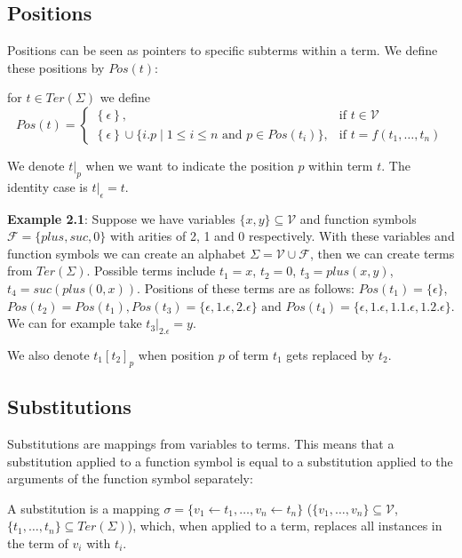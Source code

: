 \subsection{Positions}
Positions can be seen as pointers to specific subterms within a term. We define these positions by $\textit{Pos}\left(t\right)$:
\begin{definition}
for $t \in \textit{Ter}\left(\Sigma\right)$ we define
$$
\textit{Pos}(t) = \left\{\begin{array}{ll}
        \left\{\epsilon\right\}, & \text{if } t \in \mathcal{V}\\
        \left\{\epsilon\right\} \cup \{i.p \mid 1 \leq i \leq n \text{ and } p  \in \textit{Pos}(t_i)\} , & \text{if } t = f(t_1, \dots, t_n)
        \end{array}\right.
$$
\end{definition}
We denote $\left.t\right|_p$ when we want to indicate the position $p$ within term $t$. The identity case is $\left.t\right|_\epsilon = t$.

\textbf{Example 2.1}: Suppose we have variables $\{ x, y \} \subseteq \mathcal{V}$ and function symbols $\mathcal{F} = \{ plus, suc, 0\}$ with arities of 2, 1 and 0 respectively. With these variables and function symbols we can create an alphabet $\Sigma = \mathcal{V} \cup \mathcal{F}$, then we can create terms from $\textit{Ter}(\Sigma)$. Possible terms include $t_1 = x$, $t_2 = 0$, $t_3 = plus(x, y)$, $t_4 = suc(plus(0, x))$. Positions of these terms are as follows: $\textit{Pos}(t_1) = \{ \epsilon \}$, $\textit{Pos}(t_2) = \textit{Pos}(t_1), \textit{Pos}(t_3) = \{ \epsilon, 1.\epsilon, 2.\epsilon \} \text{ and }\textit{Pos}(t_4) = \{ \epsilon, 1.\epsilon, 1.1.\epsilon, 1.2.\epsilon \}$. We can for example take $\left. t_3\right|_{2.\epsilon} = y$.

We also denote $t_1\left[ t_2 \right]_p$ when position $p$ of term $t_1$ gets replaced by $t_2$. 

\subsection{Substitutions}
Substitutions are mappings from variables to terms. This means that a substitution applied to a function symbol is equal to a substitution applied to the arguments of the function symbol separately:
\begin{definition}
A substitution is a mapping $\sigma = \{ v_1 \leftarrow t_1, \dots, v_n \leftarrow t_n \}$ ($\{ v_1, \dots, v_n \} \subseteq \mathcal{V}$, $\{ t_1, \dots, t_n\} \subseteq \textit{Ter}(\Sigma)$), which, when applied to a term, replaces all instances in the term of $v_i$ with $t_i$.
\end{definition}

